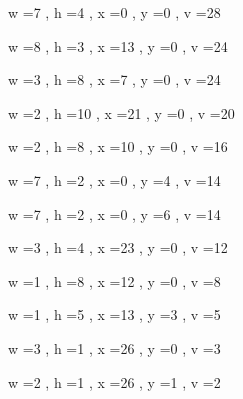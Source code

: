 \documentclass[11pt]{article}
\begin{document}
w =7 , h =4 , x =0 , y =0 , v =28
\par
w =8 , h =3 , x =13 , y =0 , v =24
\par
w =3 , h =8 , x =7 , y =0 , v =24
\par
w =2 , h =10 , x =21 , y =0 , v =20
\par
w =2 , h =8 , x =10 , y =0 , v =16
\par
w =7 , h =2 , x =0 , y =4 , v =14
\par
w =7 , h =2 , x =0 , y =6 , v =14
\par
w =3 , h =4 , x =23 , y =0 , v =12
\par
w =1 , h =8 , x =12 , y =0 , v =8
\par
w =1 , h =5 , x =13 , y =3 , v =5
\par
w =3 , h =1 , x =26 , y =0 , v =3
\par
w =2 , h =1 , x =26 , y =1 , v =2
\par
\newpage
\end{document}
